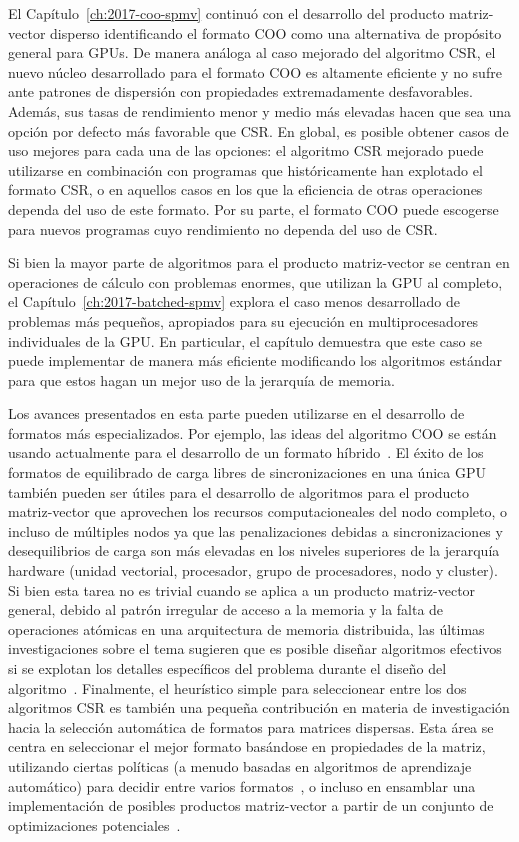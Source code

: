 El Capítulo~\ref{ch:2017-coo-spmv} continuó con el desarrollo del producto
matriz-vector disperso identificando el formato COO como una alternativa de
propósito general para GPUs. De manera análoga al caso mejorado del algoritmo
CSR, el nuevo núcleo desarrollado para el formato COO es altamente eficiente y
no sufre ante patrones de dispersión con propiedades extremadamente
desfavorables. Además, sus tasas de rendimiento menor y medio más elevadas hacen
que sea una opción por defecto más favorable que CSR.  En global, es posible
obtener casos de uso mejores para cada una de las opciones: el algoritmo CSR
mejorado puede utilizarse en combinación con programas que históricamente han
explotado el formato CSR, o en aquellos casos en los que la eficiencia de otras
operaciones dependa del uso de este formato. Por su parte, el formato COO puede
escogerse para nuevos programas cuyo rendimiento no dependa del uso de CSR.

Si bien la mayor parte de algoritmos para el producto matriz-vector se centran
en operaciones de cálculo con problemas enormes, que utilizan la GPU al
completo, el Capítulo~\ref{ch:2017-batched-spmv} explora el caso menos
desarrollado de problemas más pequeños, apropiados para su ejecución en
multiprocesadores individuales de la GPU.  En particular, el capítulo demuestra
que este caso se puede implementar de manera más eficiente modificando los
algoritmos estándar para que estos hagan un mejor uso de la jerarquía de
memoria.

Los avances presentados en esta parte pueden utilizarse en el desarrollo de
formatos más especializados. Por ejemplo, las ideas del algoritmo COO se están
usando actualmente para el desarrollo de un formato híbrido~\cite{hybrid}.  El
éxito de los formatos de equilibrado de carga libres de sincronizaciones en una
única GPU también pueden ser útiles para el desarrollo de algoritmos para el
producto matriz-vector que aprovechen los recursos computacioneales del nodo
completo, o incluso de múltiples nodos ya que las penalizaciones debidas a
sincronizaciones y desequilibrios de carga son más elevadas en los niveles
superiores de la jerarquía hardware (unidad vectorial, procesador, grupo de
procesadores, nodo y cluster).  Si bien esta tarea no es trivial cuando se
aplica a un producto matriz-vector general, debido al patrón irregular de acceso
a la memoria y la falta de operaciones atómicas en una arquitectura de memoria
distribuida, las últimas investigaciones sobre el tema sugieren que es posible
diseñar algoritmos efectivos si se explotan los detalles específicos del
problema durante el diseño del algoritmo~\cite{distributed-spmv}. Finalmente, el
heurístico simple para seleccionear entre los dos algoritmos CSR es también una
pequeña contribución en materia de investigación hacia la selección automática
de formatos para matrices dispersas. Esta área se centra en seleccionar el mejor
formato basándose en propiedades de la matriz, utilizando ciertas políticas (a
menudo basadas en algoritmos de aprendizaje automático) para decidir entre
varios formatos~\cite{clspmv,gpu-selection}, o incluso en ensamblar una
implementación de posibles productos matriz-vector a partir de un conjunto de
optimizaciones potenciales~\cite{elafrou}.

